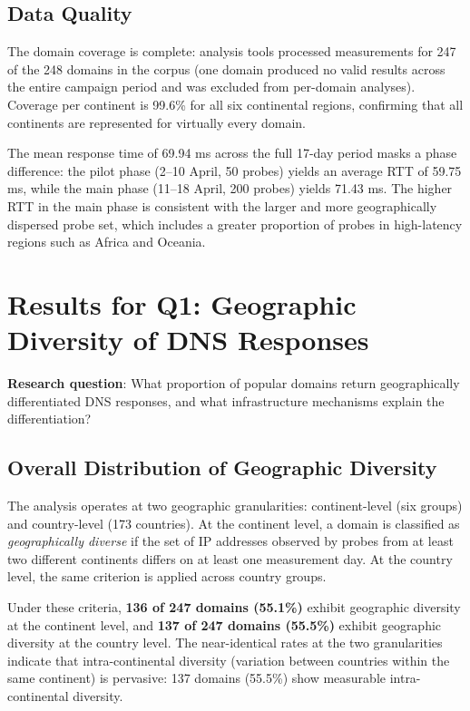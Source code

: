 \subsection{Data Quality}
\label{subsec:4.1.3}

The domain coverage is complete: analysis tools processed measurements for 247 of the 248 domains in the corpus (one domain produced no valid results across the entire campaign period and was excluded from per-domain analyses). Coverage per continent is 99.6\% for all six continental regions, confirming that all continents are represented for virtually every domain.

The mean response time of 69.94 ms across the full 17-day period masks a phase difference: the pilot phase (2--10 April, 50 probes) yields an average RTT of 59.75 ms, while the main phase (11--18 April, 200 probes) yields 71.43 ms. The higher RTT in the main phase is consistent with the larger and more geographically dispersed probe set, which includes a greater proportion of probes in high-latency regions such as Africa and Oceania.

\bigskip
\section{Results for Q1: Geographic Diversity of DNS Responses}
\label{sec:4.2}

\textbf{Research question}: What proportion of popular domains return geographically differentiated DNS responses, and what infrastructure mechanisms explain the differentiation?

\subsection{Overall Distribution of Geographic Diversity}
\label{subsec:4.2.1}

The analysis operates at two geographic granularities: continent-level (six groups) and country-level (173 countries). At the continent level, a domain is classified as \emph{geographically diverse} if the set of IP addresses observed by probes from at least two different continents differs on at least one measurement day. At the country level, the same criterion is applied across country groups.

Under these criteria, \textbf{136 of 247 domains (55.1\%)} exhibit geographic diversity at the continent level, and \textbf{137 of 247 domains (55.5\%)} exhibit geographic diversity at the country level. The near-identical rates at the two granularities indicate that intra-continental diversity (variation between countries within the same continent) is pervasive: 137 domains (55.5\%) show measurable intra-continental diversity.

